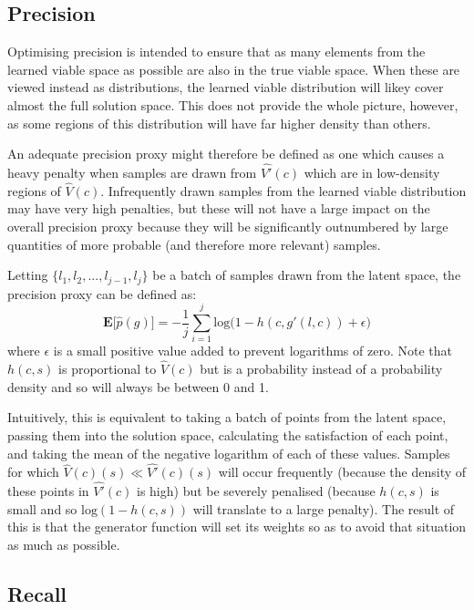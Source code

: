\documentclass[../../main.tex]{subfiles}
\begin{document}
\subsection{Precision} \label{subsection:precision}

Optimising precision is intended to ensure that as many elements from the learned viable space as possible are also in the true viable space.
When these are viewed instead as distributions, the learned viable distribution will likey cover almost the full solution space.
This does not provide the whole picture, however, as some regions of this distribution will have far higher density than others.

An adequate precision proxy might therefore be defined as one which causes a heavy penalty when samples are drawn from $\hat{V'}(c)$ which are in low-density regions of $\hat{V}(c)$.
Infrequently drawn samples from the learned viable distribution may have very high penalties, but these will not have a large impact on the overall precision proxy because they will be significantly outnumbered by large quantities of more probable (and therefore more relevant) samples.

Letting $\{l_1, l_2, ..., l_{j-1}, l_j\}$ be a batch of samples drawn from the latent space, the precision proxy can be defined as:
$$\textbf{E}\big[\hat{p}(g)\big] = -\frac{1}{j}\sum_{i=1}^{j}
\text{log} \big( 1 - h(c,g'(l, c)) + \epsilon \big)
$$
where $\epsilon$ is a small positive value added to prevent logarithms of zero.
Note that $h(c, s)$ is proportional to $\hat{V}(c)$ but is a probability instead of a probability density and so will always be between 0 and 1.

Intuitively, this is equivalent to taking a batch of points from the latent space, passing them into the solution space, calculating the satisfaction of each point, and taking the mean of the negative logarithm of each of these values.
Samples for which $\hat{V}(c)(s) \ll \hat{V'}(c)(s)$ will occur frequently (because the density of these points in $\hat{V'}(c)$ is high) but be severely penalised (because $h(c, s)$ is small and so $\text{log}(1 - h(c, s))$ will translate to a large penalty).
The result of this is that the generator function will set its weights so as to avoid that situation as much as possible.

\subsection{Recall} \label{subsection:recall}
\end{document}

